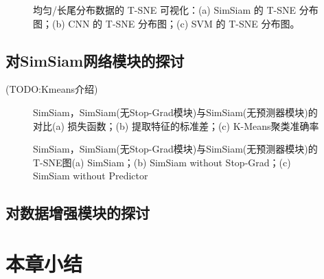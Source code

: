 \documentclass[master]{thesis-uestc}
\begin{document}
\begin{figure}[h]
    \centering
    \caption{均匀/长尾分布数据的 T-SNE 可视化：(a) SimSiam 的 T-SNE 分布图；(b) CNN 的 T-SNE 分布图；(c) SVM 的 T-SNE 分布图。}
    \label{tsne_of_all}
\end{figure}

\subsection{对SimSiam网络模块的探讨}
(TODO:Kmeans介绍)
\begin{figure}[h]
    \centering
    \caption{SimSiam，SimSiam(无Stop-Grad模块)与SimSiam(无预测器模块)的对比(a) 损失函数；(b) 提取特征的标准差；(c) K-Means聚类准确率}
    \label{train_process_simsiam_discuss}
\end{figure}

\begin{figure}[h]
    \centering
    \caption{SimSiam，SimSiam(无Stop-Grad模块)与SimSiam(无预测器模块)的T-SNE图(a) SimSiam；(b) SimSiam without Stop-Grad；(c) SimSiam without Predictor}
    \label{tsne_simsiam_discuss}
\end{figure}


\subsection{对数据增强模块的探讨}


\section{本章小结}
\end{document}
